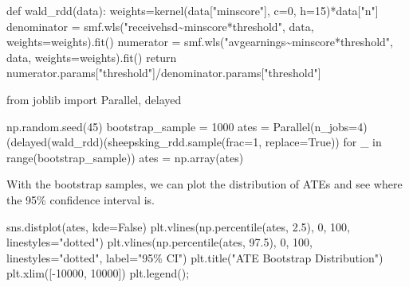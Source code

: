 \documentclass[
  letterpaper,
  DIV=11,
  numbers=noendperiod]{scrreprt}
\newenvironment{Shaded}{\begin{snugshade}}{\end{snugshade}}
\newcommand{\BuiltInTok}[1]{\textcolor[rgb]{0.00,0.23,0.31}{#1}}
\newcommand{\ControlFlowTok}[1]{\textcolor[rgb]{0.00,0.23,0.31}{#1}}
\newcommand{\DecValTok}[1]{\textcolor[rgb]{0.68,0.00,0.00}{#1}}
\newcommand{\FloatTok}[1]{\textcolor[rgb]{0.68,0.00,0.00}{#1}}
\newcommand{\ImportTok}[1]{\textcolor[rgb]{0.00,0.46,0.62}{#1}}
\newcommand{\KeywordTok}[1]{\textcolor[rgb]{0.00,0.23,0.31}{#1}}
\newcommand{\NormalTok}[1]{\textcolor[rgb]{0.00,0.23,0.31}{#1}}
\newcommand{\OperatorTok}[1]{\textcolor[rgb]{0.37,0.37,0.37}{#1}}
\newcommand{\StringTok}[1]{\textcolor[rgb]{0.13,0.47,0.30}{#1}}
\newcommand{\VariableTok}[1]{\textcolor[rgb]{0.07,0.07,0.07}{#1}}
\begin{document}
\begin{Shaded}
\begin{Highlighting}[]
\KeywordTok{def}\NormalTok{ wald\_rdd(data):}
\NormalTok{    weights}\OperatorTok{=}\NormalTok{kernel(data[}\StringTok{"minscore"}\NormalTok{], c}\OperatorTok{=}\DecValTok{0}\NormalTok{, h}\OperatorTok{=}\DecValTok{15}\NormalTok{)}\OperatorTok{*}\NormalTok{data[}\StringTok{"n"}\NormalTok{]}
\NormalTok{    denominator }\OperatorTok{=}\NormalTok{ smf.wls(}\StringTok{"receivehsd\textasciitilde{}minscore*threshold"}\NormalTok{, data, weights}\OperatorTok{=}\NormalTok{weights).fit()}
\NormalTok{    numerator }\OperatorTok{=}\NormalTok{ smf.wls(}\StringTok{"avgearnings\textasciitilde{}minscore*threshold"}\NormalTok{, data, weights}\OperatorTok{=}\NormalTok{weights).fit()}
    \ControlFlowTok{return}\NormalTok{ numerator.params[}\StringTok{"threshold"}\NormalTok{]}\OperatorTok{/}\NormalTok{denominator.params[}\StringTok{"threshold"}\NormalTok{]}
\end{Highlighting}
\end{Shaded}

\begin{Shaded}
\begin{Highlighting}[]
\ImportTok{from}\NormalTok{ joblib }\ImportTok{import}\NormalTok{ Parallel, delayed }

\NormalTok{np.random.seed(}\DecValTok{45}\NormalTok{)}
\NormalTok{bootstrap\_sample }\OperatorTok{=} \DecValTok{1000}
\NormalTok{ates }\OperatorTok{=}\NormalTok{ Parallel(n\_jobs}\OperatorTok{=}\DecValTok{4}\NormalTok{)(delayed(wald\_rdd)(sheepsking\_rdd.sample(frac}\OperatorTok{=}\DecValTok{1}\NormalTok{, replace}\OperatorTok{=}\VariableTok{True}\NormalTok{))}
                          \ControlFlowTok{for}\NormalTok{ \_ }\KeywordTok{in} \BuiltInTok{range}\NormalTok{(bootstrap\_sample))}
\NormalTok{ates }\OperatorTok{=}\NormalTok{ np.array(ates)}
\end{Highlighting}
\end{Shaded}

With the bootstrap samples, we can plot the distribution of ATEs and see
where the 95\% confidence interval is.

\begin{Shaded}
\begin{Highlighting}[]
\NormalTok{sns.distplot(ates, kde}\OperatorTok{=}\VariableTok{False}\NormalTok{)}
\NormalTok{plt.vlines(np.percentile(ates, }\FloatTok{2.5}\NormalTok{), }\DecValTok{0}\NormalTok{, }\DecValTok{100}\NormalTok{, linestyles}\OperatorTok{=}\StringTok{"dotted"}\NormalTok{)}
\NormalTok{plt.vlines(np.percentile(ates, }\FloatTok{97.5}\NormalTok{), }\DecValTok{0}\NormalTok{, }\DecValTok{100}\NormalTok{, linestyles}\OperatorTok{=}\StringTok{"dotted"}\NormalTok{, label}\OperatorTok{=}\StringTok{"95\% CI"}\NormalTok{)}
\NormalTok{plt.title(}\StringTok{"ATE Bootstrap Distribution"}\NormalTok{)}
\NormalTok{plt.xlim([}\OperatorTok{{-}}\DecValTok{10000}\NormalTok{, }\DecValTok{10000}\NormalTok{])}
\NormalTok{plt.legend()}\OperatorTok{;}
\end{Highlighting}
\end{Shaded}
\end{document}
